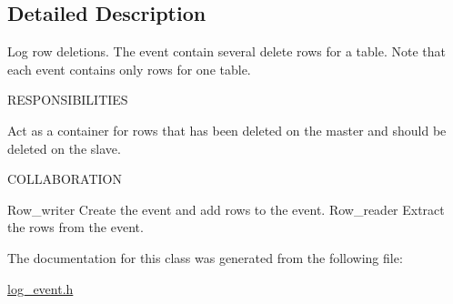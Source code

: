\subsection{Detailed Description}
Log row deletions. The event contain several delete rows for a table. Note that each event contains only rows for one table.

R\+E\+S\+P\+O\+N\+S\+I\+B\+I\+L\+I\+T\+I\+ES


\begin{DoxyItemize}
\item Act as a container for rows that has been deleted on the master and should be deleted on the slave.
\end{DoxyItemize}

C\+O\+L\+L\+A\+B\+O\+R\+A\+T\+I\+ON

Row\+\_\+writer Create the event and add rows to the event. Row\+\_\+reader Extract the rows from the event. 

The documentation for this class was generated from the following file\+:\begin{DoxyCompactItemize}
\item 
\mbox{\hyperlink{log__event_8h}{log\+\_\+event.\+h}}\end{DoxyCompactItemize}
